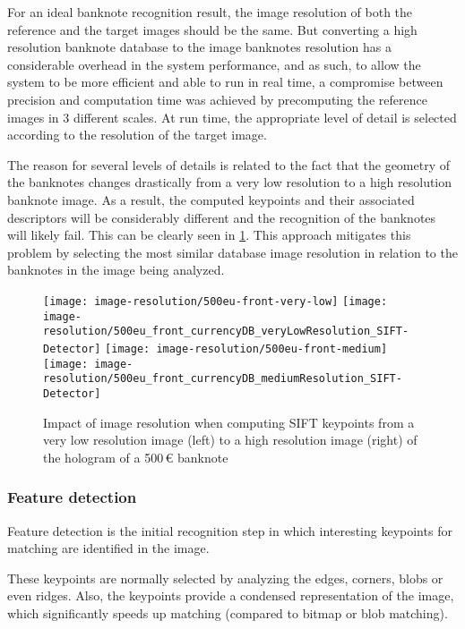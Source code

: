 For an ideal banknote recognition result, the image resolution of both the reference and the target images should be the same. But converting a high resolution banknote database to the image banknotes resolution has a considerable overhead in the system performance, and as such, to allow the system to be more efficient and able to run in real time, a compromise between precision and computation time was achieved by precomputing the reference images in 3 different scales. At run time, the appropriate level of detail is selected according to the resolution of the target image.

The reason for several levels of details is related to the fact that the geometry of the banknotes changes drastically from a very low resolution to a high resolution banknote image. As a result, the computed keypoints and their associated descriptors will be considerably different and the recognition of the banknotes will likely fail. This can be clearly seen in \cref{fig:banknote-500-front-resolution-difference}. This approach mitigates this problem by selecting the most similar database image resolution in relation to the banknotes in the image being analyzed.

\begin{figure}[H]
	\centering
	\texttt{[image: image-resolution/500eu-front-very-low]}\hfill
	\texttt{[image: image-resolution/500eu\_front\_currencyDB\_veryLowResolution\_SIFT-Detector]}\hfill
	\texttt{[image: image-resolution/500eu-front-medium]}\hfill
	\texttt{[image: image-resolution/500eu\_front\_currencyDB\_mediumResolution\_SIFT-Detector]}
	\caption{Impact of image resolution when computing SIFT keypoints from a very low resolution image (left) to a high resolution image (right) of the hologram of a 500\,\euro{} banknote}
	\label{fig:banknote-500-front-resolution-difference}
\end{figure}


\subsubsection{Feature detection}\label{sec:feature-detection}
Feature detection is the initial recognition step in which interesting keypoints for matching are identified in the image.

These keypoints are normally selected by analyzing the edges, corners, blobs or even ridges. Also, the keypoints provide a condensed representation of the image, which significantly speeds up matching (compared to bitmap or blob matching).

